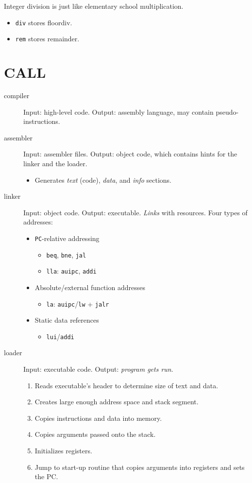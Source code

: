 Integer division is just like elementary school multiplication.
\begin{itemize}
	\item \texttt{div} stores floordiv.
	\item \texttt{rem} stores remainder.
\end{itemize}

\section{CALL}
\begin{description}
	\item[compiler] Input: high-level code. Output: assembly language, may contain pseudo-instructions.
	\item[assembler] Input: assembler files. Output: object code, which contains hints for the linker and the loader.
	\begin{itemize}
		\item Generates \emph{text} (code), \emph{data}, and \emph{info} sections.
	\end{itemize}
	\item[linker] Input: object code. Output: executable. \emph{Links} with resources. Four types of addresses:
	\begin{itemize}
		\item \texttt{PC}-relative addressing
			\begin{itemize}
				\item \texttt{beq}, \texttt{bne}, \texttt{jal}
				\item \texttt{lla}: \texttt{auipc}, \texttt{addi}
			\end{itemize}
		\item Absolute/external function addresses
			\begin{itemize}
				\item \texttt{la}: \texttt{auipc}/\texttt{lw} + \texttt{jalr}
			\end{itemize}
		\item Static data references
			\begin{itemize}
				\item \texttt{lui}/\texttt{addi}
			\end{itemize}
	\end{itemize}
	\item[loader] Input: executable code. Output: \emph{program gets run}.
		\begin{enumerate}
			\item Reads executable's header to determine size of text and data.
			\item Creates large enough address space and stack segment.
			\item Copies instructions and data into memory.
			\item Copies arguments passed onto the stack.
			\item Initializes registers.
			\item Jump to start-up routine that copies arguments into registers and sets the PC.
		\end{enumerate}
\end{description}
